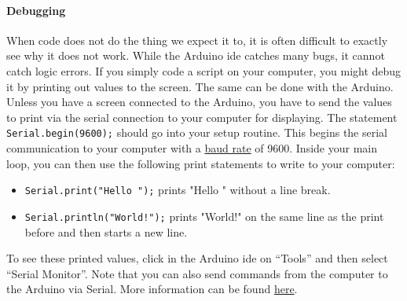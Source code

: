 \paragraph{Debugging} When code does not do the thing we expect it to, it is often difficult to exactly see why it does not work. While the Arduino \ac{ide} catches many bugs, it cannot catch logic errors. If you simply code a script on your computer, you might debug it by printing out values to the screen. The same can be done with the Arduino. Unless you have a screen connected to the Arduino, you have to send the values to print via the serial connection to your computer for displaying. The statement \lstinline{Serial.begin(9600);} should go into your setup routine. This begins the serial communication to your computer with a \href{https://en.wikipedia.org/wiki/Baud}{baud rate} of 9600. Inside your main loop, you can then use the following print statements to write to your computer:
\begin{itemize}
    \item \lstinline{Serial.print("Hello ");} prints "Hello " without a line break.
    \item \lstinline{Serial.println("World!");} prints "World!" on the same line as the print before and then starts a new line.
\end{itemize}
To see these printed values, click in the Arduino \ac{ide} on ``Tools'' and then select ``Serial Monitor''. Note that you can also send commands from the computer to the Arduino via Serial. More information can be found \href{https://www.arduino.cc/reference/en/language/functions/communication/serial/}{here}.


